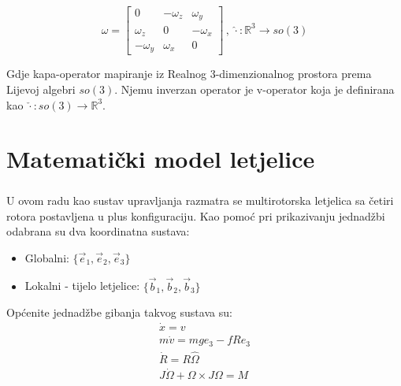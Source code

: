 \documentclass[times, utf8, diplomski]{fer}
\begin{document}
	\begin{equation}
		\hat{\omega} = 
		\begin{bmatrix}
			0			&	-\omega_z	& 	\omega_y \\
			\omega_z	&	0			& 	-\omega_x \\
			-\omega_y	&	\omega_x	&	0
		\end{bmatrix} \, , \, \hat{\cdot}: \mathbb{R}^3 \rightarrow so(3)
	\end{equation}
	
	\noindent Gdje kapa-operator mapiranje iz Realnog 3-dimenzionalnog prostora prema Lijevoj algebri $so(3)$. Njemu inverzan operator je v-operator koja je definirana kao $\check{\cdot}:so(3) \rightarrow \mathbb{R}^3$.
	
\chapter{Matematički model letjelice}

\paragraph{}U ovom radu kao sustav upravljanja razmatra se multirotorska letjelica sa četiri rotora postavljena u plus konfiguraciju. Kao pomoć pri prikazivanju jednadžbi odabrana su dva koordinatna sustava: 
\begin{itemize}
	\item Globalni: $\{\vec{e}_1, \vec{e}_2, \vec{e}_3\}$
	\item Lokalni - tijelo letjelice: $\{\vec{b}_1, \vec{b}_2, \vec{b}_3\}$
\end{itemize}

\noindent Općenite jednadžbe gibanja takvog sustava su:
\begin{gather}
	\dot{x} = v \\
	m \dot{v} = mge_3 - fRe_3 \label{thrust_dyn}\\
	\dot{R} = R\hat{\Omega} \\
	J\dot{\Omega} + \Omega \times J\Omega = M
\end{gather}
\end{document}
